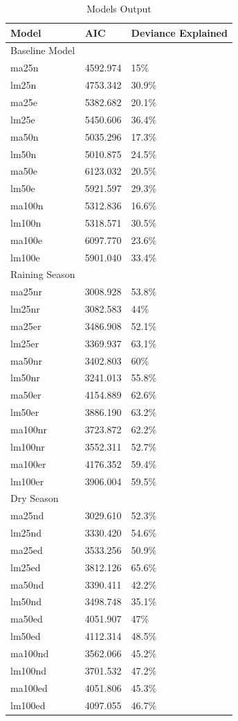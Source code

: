 \begin{table}[H]
\footnotesize
\caption{Models Output}
\begin{tabularx}{0.9\linewidth}{lxx}
\hline
\hline
Model  & AIC &   Deviance Explained\\
\hline
Baseline Model & & \\
\hline
ma25n & 4592.974 & 15\%\\
lm25n & 4753.342 & 30.9\%\\
ma25e & 5382.682 & 20.1\%\\
lm25e & 5450.606 & 36.4\%\\
ma50n & 5035.296 & 17.3\%\\
lm50n & 5010.875 & 24.5\%\\
ma50e & 6123.032 & 20.5\%\\
lm50e & 5921.597 & 29.3\% \\
ma100n & 5312.836 & 16.6\%\\
lm100n & 5318.571 & 30.5\%\\
ma100e & 6097.770 & 23.6\%\\
lm100e & 5901.040 & 33.4\%\\
\hline
Raining Season &    &\\
\hline
ma25nr & 3008.928 & 53.8\% \\
lm25nr & 3082.583 & 44\% \\
ma25er & 3486.908 & 52.1\% \\
lm25er & 3369.937 & 63.1\%\\
ma50nr & 3402.803 & 60\%\\
lm50nr & 3241.013 & 55.8\% \\
ma50er & 4154.889 & 62.6\%\\
lm50er & 3886.190 & 63.2\%\\
ma100nr & 3723.872 & 62.2\%\\
lm100nr & 3552.311 & 52.7\% \\
ma100er & 4176.352 & 59.4\% \\
lm100er & 3906.004 & 59.5\% \\
\hline
Dry Season&    &\\
\hline
ma25nd & 3029.610 & 52.3\% \\
lm25nd & 3330.420 & 54.6\% \\
ma25ed & 3533.256 & 50.9\%\\
lm25ed & 3812.126 & 65.6\%\\
ma50nd & 3390.411 & 42.2\%\\
lm50nd & 3498.748 & 35.1\%\\
ma50ed & 4051.907 & 47\%\\
lm50ed & 4112.314 & 48.5\%\\
ma100nd & 3562.066 & 45.2\%\\
lm100nd & 3701.532 & 47.2\%\\
ma100ed & 4051.806 & 45.3\% \\
lm100ed & 4097.055 & 46.7\% \\
\hline
\hline
\end{tabularx}
\label{results1}
\end{table}


